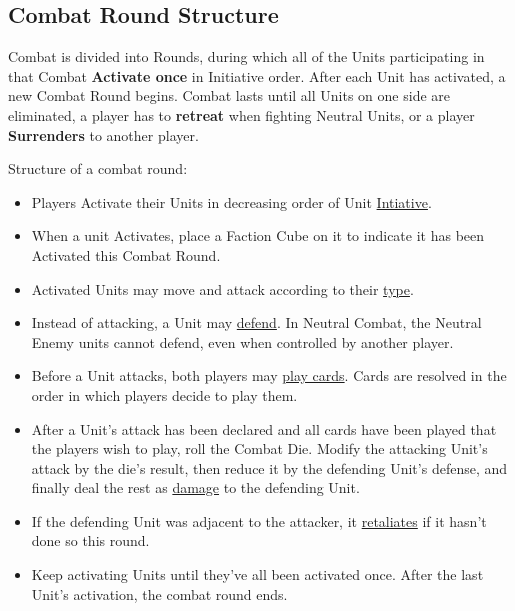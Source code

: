 \begin{multicols}{2}

\subsection*{Combat Round Structure}
Combat is divided into Rounds, during which all of the Units participating in that Combat \textbf{Activate once} in Initiative order.
After each Unit has activated, a new Combat Round begins.
Combat lasts until all Units on one side are eliminated, a player has to \textbf{retreat} when fighting Neutral Units, or a player \textbf{Surrenders} to another player.

Structure of a combat round:
\begin{itemize}
  \item Players Activate their Units in decreasing order of Unit \hyperlink{Initiative}{Intiative}.
  \item When a unit Activates, place a Faction Cube on it to indicate it has been Activated this Combat Round.
  \item Activated Units may move and attack according to their \hyperlink{Unittype}{type}.
  \item Instead of attacking, a Unit may \hyperlink{Defend}{defend}.
  In Neutral Combat, the Neutral Enemy units cannot defend, even when controlled by another player.
  \item Before a Unit attacks, both players may \hyperlink{CombatCards}{play cards}. Cards are resolved in the order in which players decide to play them.
  \item After a Unit's attack has been declared and all cards have been played that the players wish to play, roll the Combat Die.
    Modify the attacking Unit's attack by the die's result, then reduce it by the defending Unit's defense, and finally deal the rest as \hyperlink{HP}{damage} to the defending Unit.
  \item If the defending Unit was adjacent to the attacker, it \hyperlink{Retaliate}{retaliates} if it hasn't done so this round.
  \item Keep activating Units until they've all been activated once.
After the last Unit's activation, the combat round ends.
\end{itemize}

\end{multicols}
